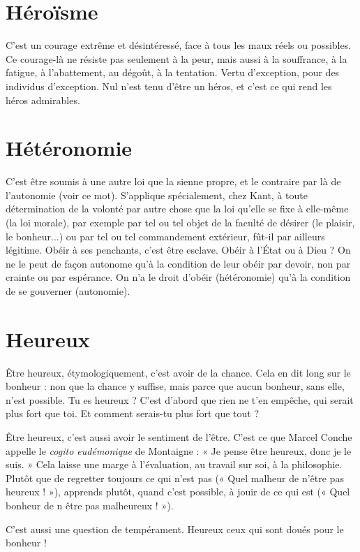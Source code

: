 \section{Héroïsme}
C’est un courage extrême et désintéressé, face à tous les maux
réels ou possibles.
Ce courage-là ne résiste pas seulement à la peur, mais aussi à la souffrance,
à la fatigue, à l'abattement, au dégoût, à la tentation. Vertu d’exception, pour
des individus d’exception. Nul n’est tenu d’être un héros, et c’est ce qui rend
les héros admirables.

\section{Hétéronomie}
C’est être soumis à une autre loi que la sienne propre, et
le contraire par là de l’autonomie (voir ce mot). S’applique
spécialement, chez Kant, à toute détermination de la volonté par autre
chose que la loi qu’elle se fixe à elle-même (la loi morale), par exemple par tel
ou tel objet de la faculté de désirer (le plaisir, le bonheur...) ou par tel ou tel
commandement extérieur, fût-il par ailleurs légitime. Obéir à ses penchants,
c’est être esclave. Obéir à l’État ou à Dieu ? On ne le peut de façon autonome
qu’à la condition de leur obéir par devoir, non par crainte ou par espérance. On
n'a le droit d’obéir (hétéronomie) qu’à la condition de se gouverner (autonomie).

\section{Heureux}
Être heureux, étymologiquement, c’est avoir de la chance. Cela
en dit long sur le bonheur : non que la chance y suffise, mais
parce que aucun bonheur, sans elle, n’est possible. Tu es heureux ? C’est
d’abord que rien ne t’en empêche, qui serait plus fort que toi. Et comment
serais-tu plus fort que tout ?

Être heureux, c’est aussi avoir le sentiment de l’être. C’est ce que Marcel
Conche appelle le {\it cogito eudémonique} de Montaigne : « Je pense être heureux,
donc je le suis. » Cela laisse une marge à l’évaluation, au travail sur soi, à la philosophie.
Plutôt que de regretter toujours ce qui n’est pas (« Quel malheur de
n'être pas heureux ! »), apprends plutôt, quand c’est possible, à jouir de ce qui
est (« Quel bonheur de n être pas malheureux ! »).

C’est aussi une question de tempérament. Heureux ceux qui sont doués
pour le bonheur !

